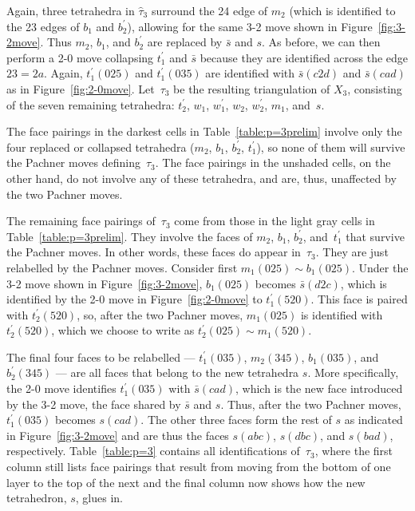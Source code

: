 \documentclass[reqno]{amsart}
\theoremstyle{plain}
\theoremstyle{definition}
\begin{document}
Again, three tetrahedra in $\hat{\tau}_3$ surround the 24 edge of $m_2$ (which is identified to the 23 edges of $b_1$ and $b_2^\prime$), allowing for the same 3-2 move  shown in Figure~\ref{fig:3-2move}.  Thus  $m_2$, $b_1$, and $b_2^\prime$ are replaced by $\bar s$ and $s$.  As before, we can then perform a 2-0  move collapsing $t_1^\prime$ and $\bar s$ because they are identified across the edge $23=2a$.  Again,  $t_1^\prime(025)$ and $t_1^\prime(035)$ are identified with $\bar s(c2d)$ and $\bar s(cad)$ as in Figure~\ref{fig:2-0move}.  Let~$\tau_{3}$ be the resulting triangulation of $X_3$, consisting of the seven remaining tetrahedra: $t_2^\prime$, $w_1$, $w_1^\prime$, $w_2$, $w_2^\prime$, $m_1$, and~$s$.

The face pairings in the darkest cells in Table~\ref{table:p=3prelim}  involve only the four replaced or collapsed tetrahedra ($m_2$, $b_1$, $b_2^\prime$, $t_1^\prime$), so none of them will survive the Pachner moves defining~$\tau_{3}$.  The face pairings in the unshaded cells, on the other hand, do not involve any of these tetrahedra, and are, thus, unaffected by the two Pachner moves.  

The remaining face pairings of~$\tau_{3}$ come from those in the light gray cells in Table~\ref{table:p=3prelim}.  They involve the faces of $m_2$, $b_1$, $b_2^\prime$, and~$t_1^\prime$ that survive the Pachner moves.  In other words, these faces do appear in~$\tau_{3}$.  They are just relabelled by the Pachner moves.  Consider first $m_1(025)\sim b_1(025)$.  Under the 3-2 move shown in Figure~\ref{fig:3-2move},  $b_1(025)$ becomes  $\bar s(d2c)$, which is identified by the 2-0 move in Figure~\ref{fig:2-0move} to $t_1^\prime(520)$.  This face is  paired with $t_2^\prime(520)$, so, after the two Pachner moves, $m_1(025)$ is identified with $t_2^\prime(520)$, which we choose to write as $t_2^\prime(025)\sim m_1(520)$.  

The final four faces to be relabelled --- $t_1^\prime(035)$, $m_2(345)$, $b_1(035)$, and $b_2^\prime(345)$ --- are all faces that belong to the new tetrahedra $s$.  More specifically, the 2-0 move identifies $t_1^\prime(035)$ with $\bar s(cad)$, which is the new face introduced by the 3-2 move, the face shared by $\bar s$ and $s$.  Thus, after the two Pachner moves, $t_1^\prime(035)$ becomes $s(cad)$.  The other three faces form the rest of $s$ as indicated in Figure~\ref{fig:3-2move} and are thus the faces $s(abc)$, $s(dbc)$, and $s(bad)$, respectively.  Table~\ref{table:p=3} contains all identifications of~$\tau_{3}$, where the first column still lists face pairings that result from moving from the bottom of one layer to the top of the next and the final column now shows how the new tetrahedron, $s$, glues in. 
\end{document}
